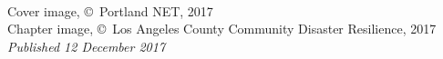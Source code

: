 \documentclass[11pt,fleqn]{book} %
\begin{document}
\let\cleardoublepage\clearpage


\begingroup
\thispagestyle{empty}
\vspace*{4cm}     %
\centering{
\normalfont\fontsize{35}{35}\sffamily\selectfont
\textbf{A Systems-Based Approach to Probability}\\  %
\vspace*{1cm}    %
{\LARGE \textbf %
{Bruce D. Marron} \\}  %
} 
\endgroup


\newpage
~\vfill
\thispagestyle{empty}

\noindent Cover image, \copyright\ Portland NET, 2017\\ %
\noindent Chapter image, \copyright\ Los Angeles County Community Disaster Resilience, 2017\\ %
\noindent \textit{Published 12 December 2017} %
\end{document}
